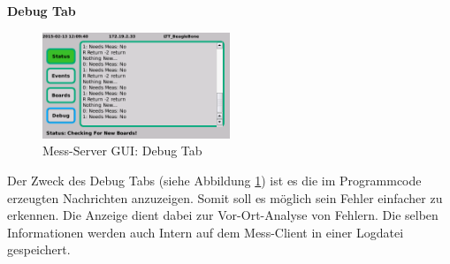 \textbf{Debug Tab}

\begin{figure}[H]
\begin{center}
\includegraphics[width=0.5\textwidth ]{img/GUI/Server_GUI_Debug2.png}
\caption{Mess-Server GUI: Debug Tab}
\label{figure_MessServerGUIDebug}
\end{center}
\end{figure}

Der Zweck des Debug Tabs (siehe Abbildung \ref{figure_MessServerGUIDebug}) ist es die im Programmcode erzeugten Nachrichten anzuzeigen. Somit soll es möglich sein Fehler einfacher zu erkennen. Die Anzeige dient dabei zur Vor-Ort-Analyse von Fehlern. Die selben Informationen werden auch Intern auf dem Mess-Client in einer Logdatei gespeichert.


